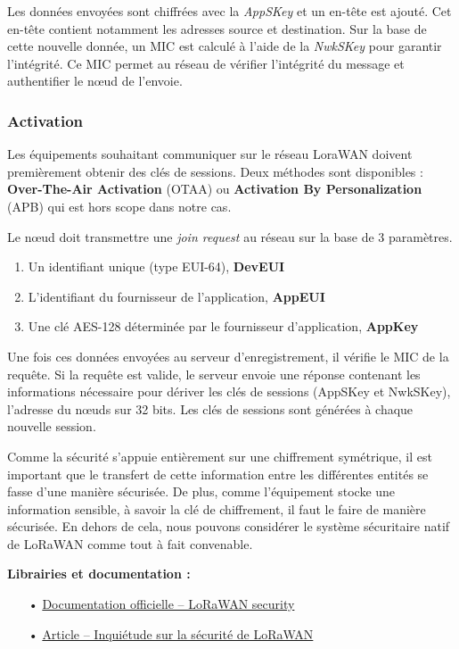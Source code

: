 \documentclass[12pt]{article}
\begin{document}
Les données envoyées sont chiffrées avec la \emph{AppSKey} et un en-tête est ajouté. Cet en-tête contient notamment les adresses source et destination. Sur la base de cette nouvelle donnée, un MIC est calculé à l'aide de la \emph{NwkSKey}  pour garantir l'intégrité. Ce MIC permet au réseau de vérifier l'intégrité du message et authentifier le nœud de l'envoie.

\subsubsection{Activation}

Les équipements souhaitant communiquer sur le réseau LoraWAN doivent premièrement obtenir des clés de sessions. Deux méthodes sont disponibles : \textbf{Over-The-Air Activation} (OTAA) ou \textbf{Activation By Personalization} (APB) qui est hors scope dans notre cas.

Le nœud doit transmettre une \emph{join request} au réseau sur la base de 3 paramètres.
\begin{enumerate}
\item Un identifiant unique (type EUI-64), \textbf{DevEUI}
\item L'identifiant du fournisseur de l'application, \textbf{AppEUI}
\item Une clé AES-128 déterminée par le fournisseur d'application, \textbf{AppKey}
\end{enumerate}
\vspace{3mm}

Une fois ces données envoyées au serveur d'enregistrement, il vérifie le MIC de la requête. Si la requête est valide, le serveur envoie une réponse contenant les informations nécessaire pour dériver les clés de sessions (AppSKey et NwkSKey), l'adresse du nœuds sur 32 bits. Les clés de sessions sont générées à chaque nouvelle session.

Comme la sécurité s'appuie entièrement sur une chiffrement symétrique, il est important que le transfert de cette information entre les différentes entités se fasse d'une manière sécurisée. De plus, comme l'équipement stocke une information sensible, à savoir la clé de chiffrement, il faut le faire de manière sécurisée. En dehors de cela, nous pouvons considérer le système sécuritaire natif de LoRaWAN comme tout à fait convenable.

\medskip
\textbf{Librairies et documentation :}

\begin{itemize}
\item[•] \href{https://www.thethingsnetwork.org/docs/lorawan/security.html}{Documentation officielle -- LoRaWAN security}
\item[•] \href{http://simfonymobile.com/blog/Should-you-worry-about-LoRaWAN-security/}{Article -- Inquiétude sur la sécurité de LoRaWAN}
\end{itemize}
\end{document}
